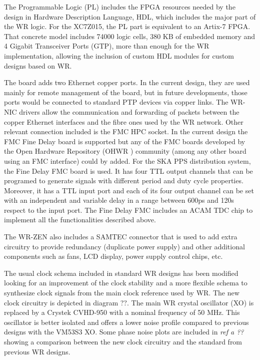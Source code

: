 The Programmable Logic (PL) includes the FPGA resources needed 
by the design in Hardware Description Language, HDL, which includes the major part of the WR logic. For the XC7Z015, the PL part is equivalent to an Artix-7 FPGA. That concrete model includes 74000 logic cells, 380 KB of embedded memory and 4 Gigabit Transceiver Ports (GTP), more than enough for the WR implementation, allowing the inclusion of custom HDL modules for custom designs based on WR.

The board adds two Ethernet copper ports. In the current design, they are used mainly for remote management of the board, but in future developments, those ports would be connected to standard PTP devices via copper links. The WR-NIC drivers allow the communication and forwarding of packets between the copper Ethernet interfaces and the fibre ones used by the WR network. Other relevant connection included is the FMC HPC socket. In the current design the FMC Fine Delay board 
is supported but any of the FMC boards developed by the Open Hardware 
Repository (OHWR \cite{ohwr:repo}) community (among any other board using an FMC interface) could by added. For the SKA PPS distribution system, the Fine Delay FMC board \cite{ohwr:fmc-fine-delay} is used. It has four TTL output channels that can be programed to generate signals with different period and duty cycle properties. Moreover, it has a TTL input port and each of its four output channel can be set with an independent and variable delay in a range between 600ps and 120s respect to the input port. The Fine Delay FMC includes an ACAM TDC chip to implement all the functionalities described above. 

The WR-ZEN also includes a SAMTEC connector that is used to add extra circuitry to provide redundancy (duplicate power supply) and other additional components such as fans, LCD display, power supply control chips, etc.

The usual clock schema included in standard WR designs has been modified looking for an improvement of the clock stability and a more flexible schema to synthesize clock signals from the main clock reference used by WR. The new clock circuitry is depicted in diagram ??. The main WR crystal oscillator (XO) is replaced by a Crystek CVHD-950 with a nominal frequency of 50 MHz. This oscillator is better isolated and offers a lower noise profile compared to previous designs with the VM53S3 XO. Some phase noise plots are included in  \textit{ref a ??} showing a comparison between the new clock circuitry and the standard from previous WR designs.

